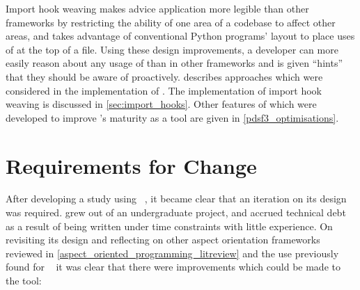 Import hook weaving makes advice application more legible than other \aop{}
frameworks by restricting the ability of one area of a codebase to affect other
areas, and takes advantage of conventional Python programs' layout to place uses
of \aop{} at the top of a file. Using these design improvements, a developer can
more easily reason about any usage of \aop{} than in other frameworks and is
given ``hints'' that they should be aware of \aspectorientation{} proactively.
 describes approaches which were considered in the
implementation of \pdsfthree{}. The implementation of import hook weaving is
discussed in \cref{sec:import_hooks}. Other features of \pdsfthree which were
developed to improve \pydysofu{}'s maturity as a tool are given in
\cref{pdsf3_optimisations}.









\section{Requirements for Change}\label{sec:pdsf3requirements}

After developing a study using \pydysofu{}~\cite{wallis2018caise}, it became clear that an iteration on its
design was required. \pydysofu{} grew out of an undergraduate project, and accrued
technical debt as a result of being written under time constraints with little
experience. On revisiting its design and reflecting on other aspect orientation
frameworks reviewed in  
\cref{aspect_oriented_programming_litreview} and the use previously found for
\pydysofu{}~\cite{wallis2018caise,wallis2018genetic} it was clear that there were
improvements which could be made to the tool:

